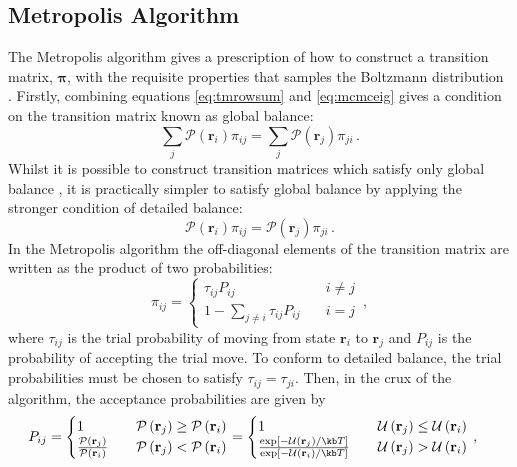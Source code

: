\subsection{Metropolis Algorithm}
\label{ssec:metropolis}

The Metropolis algorithm gives a prescription of how to construct a transition matrix, $\bm{\pi}$, with the requisite properties that samples the Boltzmann distribution \cite{Metropolis1953}.
Firstly, combining equations \eqref{eq:tmrowsum} and \eqref{eq:mcmceig} gives a condition on the transition matrix known as global balance:
\begin{equation}
	\sum_j \mathcal{P}\left(\mathbf{r}_i\right)\pi_{ij} = \sum_j \mathcal{P}\left(\mathbf{r}_j\right)\pi_{ji}\,.
\end{equation} 
Whilst it is possible to construct transition matrices which satisfy only global balance \cite{Manousiouthakis1999,Suwa2010,Michel2014}, it is practically simpler to satisfy global balance by applying the stronger condition of detailed balance:
\begin{equation}
	\mathcal{P}\left(\mathbf{r}_i\right)\pi_{ij} = \mathcal{P}\left(\mathbf{r}_j\right)\pi_{ji}\,.
\end{equation}
In the Metropolis algorithm the off\--diagonal elements of the transition matrix are written as the product of two probabilities: 
\begin{equation}
	\pi_{ij} = \begin{cases} 
		\tau_{ij}P_{ij} \quad & i\neq j \\
		1-\sum\limits_{j\neq i}\tau_{ij}P_{ij} \quad & i=j
	\end{cases}\,,
\end{equation}
where $\tau_{ij}$ is the trial probability of moving from state $\mathbf{r}_i$ to $\mathbf{r}_j$ and $P_{ij}$ is the probability of accepting the trial move.
To conform to detailed balance, the trial probabilities must be chosen to satisfy $\tau_{ij}=\tau_{ji}$.
Then, in the crux of the algorithm, the acceptance probabilities are given by
\begin{align}
	 P_{ij}&=\begin{cases}
	 	1 \quad &\mathcal{P}\left(\mathbf{r}_j\right)\geq \mathcal{P}\left(\mathbf{r}_i\right) \\
	 	\frac{\mathcal{P}\left(\mathbf{r}_j\right)}{\mathcal{P}\left(\mathbf{r}_i\right)} \quad & \mathcal{P}\left(\mathbf{r}_j\right)< \mathcal{P}\left(\mathbf{r}_i\right)
	 \end{cases}
	 =\begin{cases}
	 	1 \quad &\mathcal{U}\left(\mathbf{r}_j\right)\leq \mathcal{U}\left(\mathbf{r}_i\right) \\
	 	\frac{\exp\left[-\mathcal{U}\left(\mathbf{r}_j\right)/\kb T\right]}{\exp\left[-\mathcal{U}\left(\mathbf{r}_i\right)/\kb T\right]} \quad & \mathcal{U}\left(\mathbf{r}_j\right)>\mathcal{U}\left(\mathbf{r}_i\right)
	 \end{cases}\,,
\end{align}
